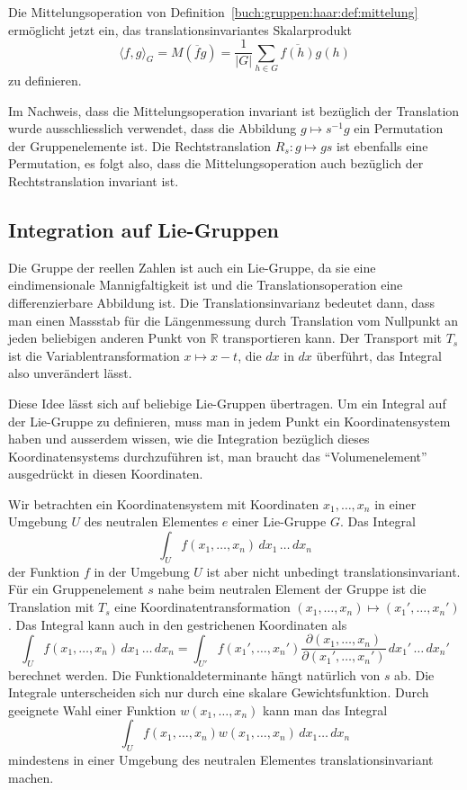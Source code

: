 Die Mittelungsoperation von Definition~\ref{buch:gruppen:haar:def:mittelung}
ermöglicht jetzt ein, das translationsinvariantes Skalarprodukt
\[
\langle f,g\rangle_G
=
M(\overline{f}g)
=
\frac{1}{|G|}
\sum_{h\in G}
\overline{f(h)}g(h)
\]
zu definieren.

Im Nachweis, dass die Mittelungsoperation invariant ist bezüglich
der Translation wurde ausschliesslich verwendet, dass die Abbildung
$g\mapsto s^{-1}g$ ein Permutation der Gruppenelemente ist.
Die Rechtstranslation $R_s\colon g\mapsto gs$ ist ebenfalls eine
Permutation, es folgt also, dass die Mittelungsoperation auch
bezüglich der Rechtstranslation invariant ist.

%
%
\subsection{Integration auf Lie-Gruppen
\label{buch:haar:subsection:lie-gruppen}}
Die Gruppe der reellen Zahlen ist auch ein Lie-Gruppe, da sie eine
eindimensionale Mannigfaltigkeit ist und die Translationsoperation
eine differenzierbare Abbildung ist.
Die Translationsinvarianz bedeutet dann, dass man einen Massstab für
die Längenmessung durch Translation vom Nullpunkt an jeden beliebigen
anderen Punkt von $\mathbb{R}$ transportieren kann.
Der Transport mit $T_s$ ist die Variablentransformation $x\mapsto x-t$,
die $dx$ in $dx$ überführt, das Integral also unverändert lässt.

Diese Idee lässt sich auf beliebige Lie-Gruppen übertragen.
Um ein Integral auf der Lie-Gruppe zu definieren, muss man in jedem
Punkt ein Koordinatensystem haben und ausserdem wissen, wie die
Integration bezüglich dieses Koordinatensystems durchzuführen ist,
man braucht das ``Volumenelement'' ausgedrückt in diesen Koordinaten.

Wir betrachten ein Koordinatensystem mit Koordinaten $x_1,\dots,x_n$
in einer Umgebung $U$ des neutralen Elementes $e$ einer Lie-Gruppe $G$.
Das Integral
\[
\int_{U} f(x_1,\dots,x_n) \,dx_1\,\dots\,dx_n
\]
der Funktion $f$ in der Umgebung $U$ ist aber nicht unbedingt
translationsinvariant.
Für ein Gruppenelement $s$ nahe beim neutralen Element der Gruppe
ist die Translation mit $T_s$ eine Koordinatentransformation
$(x_1,\dots,x_n)\mapsto (x_1',\dots,x_n')$.
Das Integral kann auch in den gestrichenen Koordinaten als
\[
\int_{U} f(x_1,\dots,x_n) \,dx_1\,\dots\,dx_n
=
\int_{U'} f(x_1',\dots,x_n')
\frac{\partial (x_1,\dots,x_n)}{\partial(x_1',\dots,x_n')}
\,dx_1'\,\dots\,dx_n'
\]
berechnet werden.
Die Funktionaldeterminante hängt natürlich von $s$ ab.
Die Integrale unterscheiden sich nur durch eine skalare Gewichtsfunktion.
Durch geeignete Wahl einer Funktion $w(x_1,\dots,x_n)$ kann man 
das Integral
\[
\int_{U} f(x_1,\dots,x_n) w(x_1,\dots,x_n)\,dx_1\dots\,dx_n
\]
mindestens in einer Umgebung des neutralen Elementes
translationsinvariant machen.

